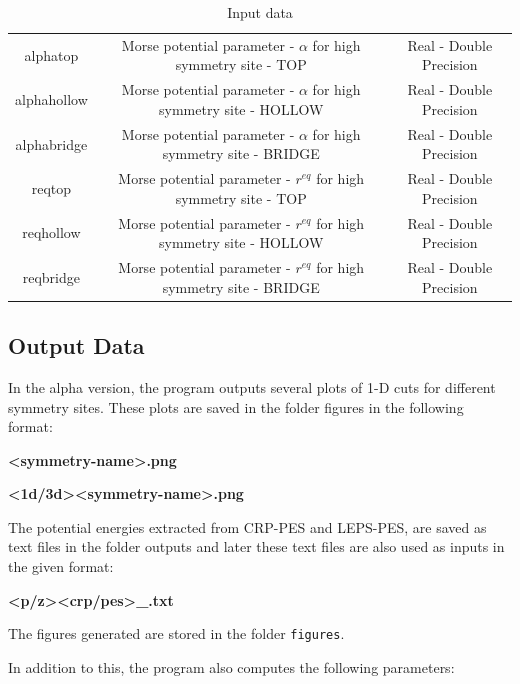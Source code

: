 \documentclass[12pt]{article}
\newcommand{\code}[1]{\colorbox{gray!18}{\texttt{#1}}}
\begin{document}
\begin{table}[h!]
{\begin{tabular}{ccc}
\midrule
alphatop & Morse potential parameter - $\alpha$ for high symmetry site - TOP & Real - Double Precision\\
alphahollow & Morse potential parameter - $\alpha$ for high symmetry site - HOLLOW & Real - Double Precision\\
alphabridge & Morse potential parameter - $\alpha$ for high symmetry site - BRIDGE & Real - Double Precision\\
\midrule
reqtop & Morse potential parameter - $r^{eq}$ for high symmetry site - TOP & Real - Double Precision\\
reqhollow & Morse potential parameter - $r^{eq}$  for high symmetry site - HOLLOW & Real - Double Precision\\
reqbridge & Morse potential parameter - $r^{eq}$  for high symmetry site - BRIDGE & Real - Double Precision\\\hline
\end{tabular}}
\caption{Input data}
\end{table} 



\subsection{ Output Data }

In the alpha version, the program outputs several plots of 1-D cuts for different symmetry sites. These plots are saved in the folder figures in the following format:
\begin{center}
\textbf{<symmetry-name>.png}  

\textbf{<1d/3d><symmetry-name>.png}

\end{center}
The potential energies extracted from CRP-PES and LEPS-PES, are saved as text files in the folder outputs and later these text files are also used as inputs in the given format:
\begin{center}
\textbf{<p/z><crp/pes>\_<symmetry-name>.txt}  
\end{center}                       
The figures generated are stored in the folder {\fontsize{10}{6}\code{figures}}.

In addition to this, the program also computes the following parameters:
\end{document}
